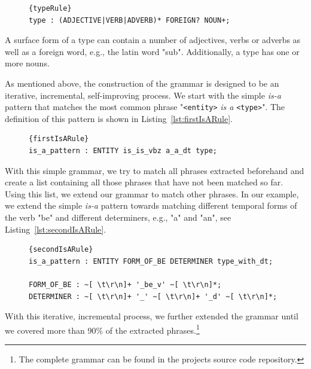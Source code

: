 \begin{figure}
\begin{lstlisting}[label=lst:typeRule, caption=The grammar rule defining a type surface form.]{typeRule}
type : (ADJECTIVE|VERB|ADVERB)* FOREIGN? NOUN+;
\end{lstlisting}
\end{figure}

A surface form of a type can contain a number of adjectives, verbs or adverbs as well as a foreign word, e.g., the latin word "sub".
Additionally, a type has one or more nouns.

As mentioned above, the construction of the grammar is designed to be an iterative, incremental, self-improving process.
We start with the simple \emph{is-a} pattern that matches the most common phrase "\texttt{<entity>} \emph{is a} \texttt{<type>}". 
The definition of this pattern is shown in Listing~\ref{lst:firstIsARule}.
\begin{figure}
\begin{lstlisting}[label=lst:firstIsARule,caption=First simple version of the \emph{is-a} pattern. \texttt{ENTITY} is a marking for the entities position.]{firstIsARule}
is_a_pattern : ENTITY is_is_vbz a_a_dt type;
\end{lstlisting}
\end{figure}

With this simple grammar, we try to match all phrases extracted beforehand and create a list containing all those phrases that have not been matched so far.
Using this list, we extend our grammar to match other phrases.
In our example, we extend the simple \emph{is-a} pattern towards matching different temporal forms of the verb "be" and different determiners, e.g., "a" and "an", see Listing~\ref{lst:secondIsARule}.

\begin{figure}
\begin{lstlisting}[label=lst:secondIsARule,caption=Extended version of the \emph{is-a} pattern.]{secondIsARule}
is_a_pattern : ENTITY FORM_OF_BE DETERMINER type_with_dt;

FORM_OF_BE : ~[ \t\r\n]+ '_be_v' ~[ \t\r\n]*;
DETERMINER : ~[ \t\r\n]+ '_' ~[ \t\r\n]+ '_d' ~[ \t\r\n]*;
\end{lstlisting}
\end{figure}

With this iterative, incremental process, we further extended the grammar until we covered more than 90\% of the extracted phrases.\footnote{The complete grammar can be found in the projects source code repository.}

